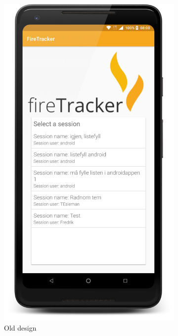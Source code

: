 \documentclass[../Main/thesis.tex]{subfiles}
\begin{document}
\begin{figure}[h]
	\centering
	\begin{subfigure}{0.2\textwidth}
		\includegraphics[width=\textwidth]{../fig/firetracker_app_old_1}
		\caption{Old design}
		\label{fig:app-old-design-sessionlist-iteration3}
	\end{subfigure}
	\begin{subfigure}{0.2\textwidth}

\end{subfigure}
\end{figure}
\end{document}
